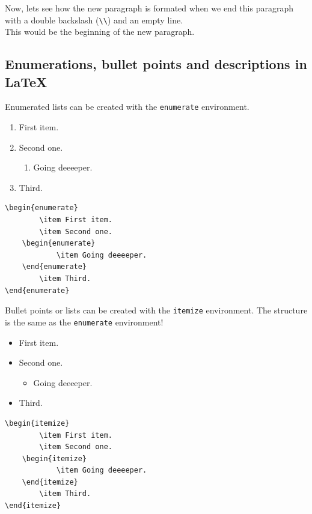 Now, lets see how the new paragraph is formated when we end this paragraph with a double backslash (\verb|\\|) and an empty line. \\

This would be the beginning of the new paragraph.

\subsection{Enumerations, bullet points and descriptions in \LaTeX}

Enumerated lists can be created with the \verb|enumerate| environment.

\begin{enumerate}
		\item First item.
		\item Second one.
	\begin{enumerate}
			\item Going deeeeper.
	\end{enumerate}
		\item Third.
\end{enumerate}

\begin{lstlisting}[language={[LaTeX]TeX}]
\begin{enumerate}
		\item First item.
		\item Second one.
	\begin{enumerate}
			\item Going deeeeper.
	\end{enumerate}
		\item Third.
\end{enumerate}
\end{lstlisting}

Bullet points or lists can be created with the \verb|itemize| environment. The structure is the same as the \verb|enumerate| environment!

\begin{itemize}
		\item First item.
		\item Second one.
	\begin{itemize}
			\item Going deeeeper.
	\end{itemize}
		\item Third.
\end{itemize}

\begin{lstlisting}[language={[LaTeX]TeX}]
\begin{itemize}
		\item First item.
		\item Second one.
	\begin{itemize}
			\item Going deeeeper.
	\end{itemize}
		\item Third.
\end{itemize}
\end{lstlisting}

